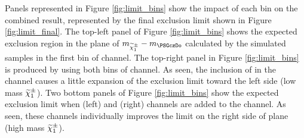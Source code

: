
Panels represented in Figure \ref{fig:limit_bins} show the impact of each bin on the combined result, represented by the final exclusion limit shown in Figure \ref{fig:limit_final}. The top-left panel of Figure \ref{fig:limit_bins} shows the expected exclusion region in the plane of $m_{\chione}-m_{\PSGczDo}$
calculated by the simulated samples in the first bin of \tauTau channel. The top-right panel in Figure \ref{fig:limit_bins} is produced by using both bins of \tauTau channel.
As seen, the inclusion of \bintwo in the \tauTau channel causes a little expansion of the exclusion limit toward the left side (low mass $\widetilde{\chi}^{\pm}_1$).
Two bottom panels of Figure \ref{fig:limit_bins} show the expected exclusion limit when \eTau (left) and \muTau (right) channels are 
added to the \tauTau channel.  As seen, these channels individually improves the limit on the right side of plane (high mass $\widetilde{\chi}^{\pm}_1$).


